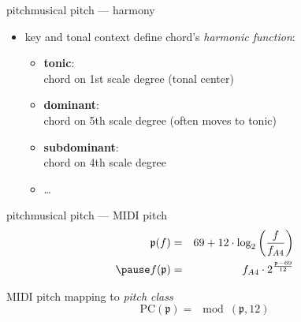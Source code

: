         \begin{frame}{pitch}{musical pitch --- harmony}
            \begin{itemize}
                \item	key and tonal context define chord's \textit{harmonic function}:
                \pause
                \begin{itemize}
                    \item	\textbf{tonic}:\\ chord on 1st scale degree (tonal center)
                    \item	\textbf{dominant}:\\ chord on 5th scale degree (often moves to tonic)
                    \item	\textbf{subdominant}:\\ chord on 4th scale degree
                    \item	\ldots
                \end{itemize}
            \end{itemize}
        \end{frame}
        
        \begin{frame}{pitch}{musical pitch --- MIDI pitch}
                \begin{eqnarray*}\label{eq:midi_pitch}
                    \mathfrak{p}(f) &=& 69 + 12\cdot\log_2\left(\frac{f}{f_{A4}}\right) \\
                    \pause
                    f(\mathfrak{p}) &=& f_{A4}\cdot2^{\frac{\mathfrak{p}-69}{12}}
                \end{eqnarray*}
                
                \pause
                MIDI pitch mapping to \textit{pitch class}
                \begin{equation*}\label{eq:pcidx}
                    \mathrm{PC}(\mathfrak{p}) = \mod(\mathfrak{p}, 12) 
                \end{equation*}
                
        \end{frame}
        
